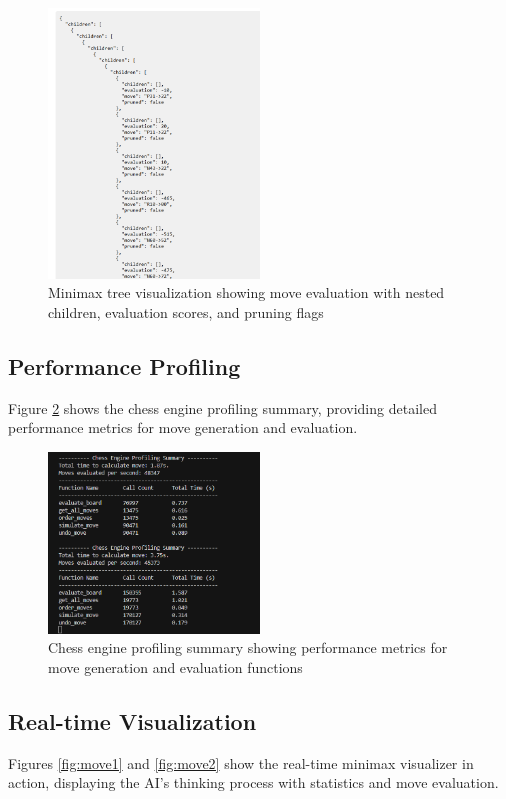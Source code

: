 \documentclass[11pt,a4paper]{report}
\begin{document}
\begin{figure}[H]
    \centering
    \includegraphics[width=0.5\textwidth]{images/moves_visualizer.png}
    \caption{Minimax tree visualization showing move evaluation with nested children, evaluation scores, and pruning flags}
    \label{fig:moves_visualizer}
\end{figure}

\subsection{Performance Profiling}
Figure \ref{fig:moves_generation} shows the chess engine profiling summary, providing detailed performance metrics for move generation and evaluation.

\begin{figure}[H]
    \centering
    \includegraphics[width=0.5\textwidth]{images/moves_generation.png}
    \caption{Chess engine profiling summary showing performance metrics for move generation and evaluation functions}
    \label{fig:moves_generation}
\end{figure}

\subsection{Real-time Visualization}
Figures \ref{fig:move1} and \ref{fig:move2} show the real-time minimax visualizer in action, displaying the AI's thinking process with statistics and move evaluation.
\end{document}
